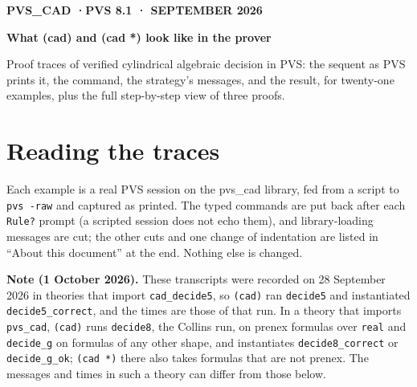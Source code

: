 \documentclass[11pt]{article}
\begin{document}
\thispagestyle{empty}
\begin{flushleft}
{\sffamily\small\bfseries\color{moss}\MakeUppercase{pvs\_cad \quad·\quad PVS 8.1 \quad· September 2026}}\par\vspace{8pt}
{\fontsize{28}{34}\selectfont\bfseries What (cad) and (cad *) look like in the prover}\par\vspace{10pt}
{\large\color{muted} Proof traces of verified cylindrical algebraic decision in PVS: the sequent as PVS prints it, the command,
the strategy's messages, and the result, for twenty-one examples, plus the full step-by-step view of three proofs.}
\end{flushleft}
\vspace{6pt}

\section{Reading the traces}
Each example is a real PVS session on the pvs\_cad library, fed from a script to \texttt{pvs -raw} and captured as printed.
The typed commands are put back after each \texttt{Rule?} prompt (a scripted session does not echo them), and
library-loading messages are cut; the other cuts and one change of indentation are listed in ``About this document'' at
the end. Nothing else is changed.

\textbf{Note (1 October 2026).} These transcripts were recorded on 28 September 2026 in theories that import
\texttt{cad\_decide5}, so \texttt{(cad)} ran \texttt{decide5} and instantiated \texttt{decide5\_correct}, and the times
are those of that run. In a theory that imports \texttt{pvs\_cad}, \texttt{(cad)} runs \texttt{decide8}, the Collins run,
on prenex formulas over \texttt{real} and \texttt{decide\_g} on formulas of any other shape, and instantiates
\texttt{decide8\_correct} or \texttt{decide\_g\_ok}; \texttt{(cad *)} there also takes formulas that are not prenex. The
messages and times in such a theory can differ from those below.
\end{document}
